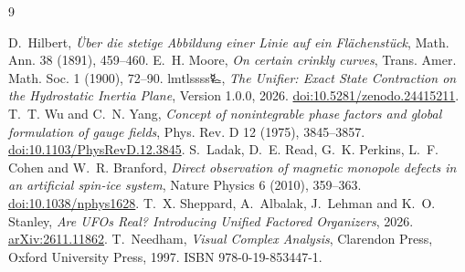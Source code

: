 \documentclass[11pt,a4paper]{article}
\theoremstyle{definition}
\begin{document}
\enlargethispage{\baselineskip}
\begin{thebibliography}{9}\raggedright
\setlength{\itemsep}{2pt plus 1pt}\setlength{\parsep}{0pt}
D.~Hilbert,
\emph{Über die stetige Abbildung einer Linie auf ein Flächenstück},
Math. Ann. 38 (1891), 459--460.
E.~H. Moore,
\emph{On certain crinkly curves},
Trans. Amer. Math. Soc. 1 (1900), 72--90.
lmtlssss{\authorsymbol 🜐}, \emph{The Unifier: Exact State Contraction on the Hydrostatic Inertia Plane}, Version 1.0.0, 2026.
\href{https://doi.org/10.5281/zenodo.24415211}{doi:10.5281/zenodo.24415211}.
T.~T. Wu and C.~N. Yang,
\emph{Concept of nonintegrable phase factors and global formulation of gauge fields},
Phys. Rev. D 12 (1975), 3845--3857.
\href{https://doi.org/10.1103/PhysRevD.12.3845}{doi:10.1103/PhysRevD.12.3845}.
S.~Ladak, D.~E. Read, G.~K. Perkins, L.~F. Cohen and W.~R. Branford,
\emph{Direct observation of magnetic monopole defects in an artificial spin-ice system},
Nature Physics 6 (2010), 359--363.
\href{https://doi.org/10.1038/nphys1628}{doi:10.1038/nphys1628}.
T.~X. Sheppard, A.~Albalak, J.~Lehman and K.~O. Stanley,
\emph{Are UFOs Real? Introducing Unified Factored Organizers},
2026.
\href{https://arxiv.org/abs/2611.11862}{arXiv:2611.11862}.
T.~Needham,
\emph{Visual Complex Analysis},
Clarendon Press, Oxford University Press, 1997.
ISBN 978-0-19-853447-1.
\end{thebibliography}
\end{document}
